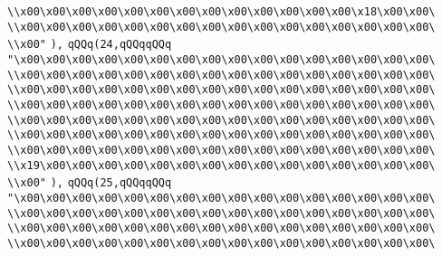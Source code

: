 \verb|\\x00\x00\x00\x00\x00\x00\x00\x00\x00\x00\x00\x00\x00\x18\x00\x00\|\newline
\verb|\\x00\x00\x00\x00\x00\x00\x00\x00\x00\x00\x00\x00\x00\x00\x00\x00\|\newline
\verb|\\x00"|\newline
\verb|),|\newline
\verb|qQQq(24,qQQqqQQq|\newline
\verb|"\x00\x00\x00\x00\x00\x00\x00\x00\x00\x00\x00\x00\x00\x00\x00\x00\|\newline
\verb|\\x00\x00\x00\x00\x00\x00\x00\x00\x00\x00\x00\x00\x00\x00\x00\x00\|\newline
\verb|\\x00\x00\x00\x00\x00\x00\x00\x00\x00\x00\x00\x00\x00\x00\x00\x00\|\newline
\verb|\\x00\x00\x00\x00\x00\x00\x00\x00\x00\x00\x00\x00\x00\x00\x00\x00\|\newline
\verb|\\x00\x00\x00\x00\x00\x00\x00\x00\x00\x00\x00\x00\x00\x00\x00\x00\|\newline
\verb|\\x00\x00\x00\x00\x00\x00\x00\x00\x00\x00\x00\x00\x00\x00\x00\x00\|\newline
\verb|\\x00\x00\x00\x00\x00\x00\x00\x00\x00\x00\x00\x00\x00\x00\x00\x00\|\newline
\verb|\\x19\x00\x00\x00\x00\x00\x00\x00\x00\x00\x00\x00\x00\x00\x00\x00\|\newline
\verb|\\x00"|\newline
\verb|),|\newline
\verb|qQQq(25,qQQqqQQq|\newline
\verb|"\x00\x00\x00\x00\x00\x00\x00\x00\x00\x00\x00\x00\x00\x00\x00\x00\|\newline
\verb|\\x00\x00\x00\x00\x00\x00\x00\x00\x00\x00\x00\x00\x00\x00\x00\x00\|\newline
\verb|\\x00\x00\x00\x00\x00\x00\x00\x00\x00\x00\x00\x00\x00\x00\x00\x00\|\newline
\verb|\\x00\x00\x00\x00\x00\x00\x00\x00\x00\x00\x00\x00\x00\x00\x00\x00\|\newline

